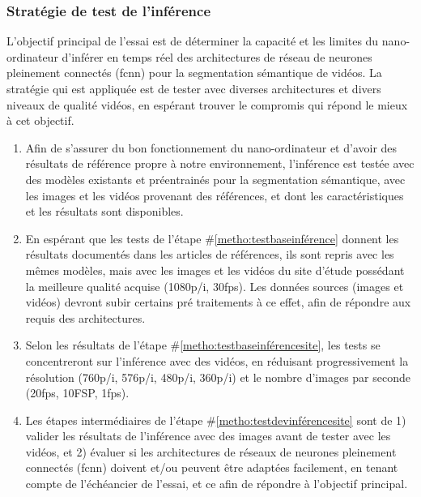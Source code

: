 \subsubsection{Stratégie de test de l'inférence} \label{section:strategie_test_inference}
\noindent L'objectif principal de l'essai est de déterminer la capacité et les limites du nano-ordinateur d'inférer en temps réel des architectures de réseau de neurones pleinement connectés (\acrshort{fcnn}) pour la segmentation sémantique de vidéos. La stratégie qui est appliquée est de tester avec diverses architectures et divers niveaux de qualité vidéos, en espérant trouver le compromis qui répond le mieux à cet objectif.
\begin{enumerate}
   \item \label{metho:testbaseinférence} Afin de s'assurer du bon fonctionnement du nano-ordinateur et d'avoir des résultats de référence propre à notre environnement, l'inférence est testée avec des modèles existants et préentrainés pour la segmentation sémantique, avec les images et les vidéos provenant des références, et dont les caractéristiques et les résultats sont disponibles. 
   \item \label{metho:testbaseinférencesite} En espérant que les tests de l'étape \#\ref{metho:testbaseinférence} donnent les résultats documentés dans les articles de références, ils sont repris avec les mêmes modèles, mais avec les images et les vidéos du site d'étude possédant la meilleure qualité acquise (1080p/i, 30\acrshort{fps}). Les données sources (images et vidéos) devront subir certains pré traitements à ce effet, afin de répondre aux requis des architectures.
   \item \label{metho:testdevinférencesite} Selon les résultats de l'étape \#\ref{metho:testbaseinférencesite}, les tests se concentreront sur l'inférence avec des vidéos, en réduisant progressivement la résolution (760p/i, 576p/i, 480p/i, 360p/i) et le nombre d'images par seconde (20\acrshort{fps}, 10FSP, 1\acrshort{fps}).
   \item Les étapes intermédiaires de l'étape \#\ref{metho:testdevinférencesite} sont de 1) valider les résultats de l'inférence avec des images avant de tester avec les vidéos, et 2) évaluer si les architectures de réseaux de neurones pleinement connectés (\acrshort{fcnn}) doivent et/ou peuvent être adaptées facilement, en tenant compte de l'échéancier de l'essai, et ce afin de répondre à l'objectif principal.
\end{enumerate}
